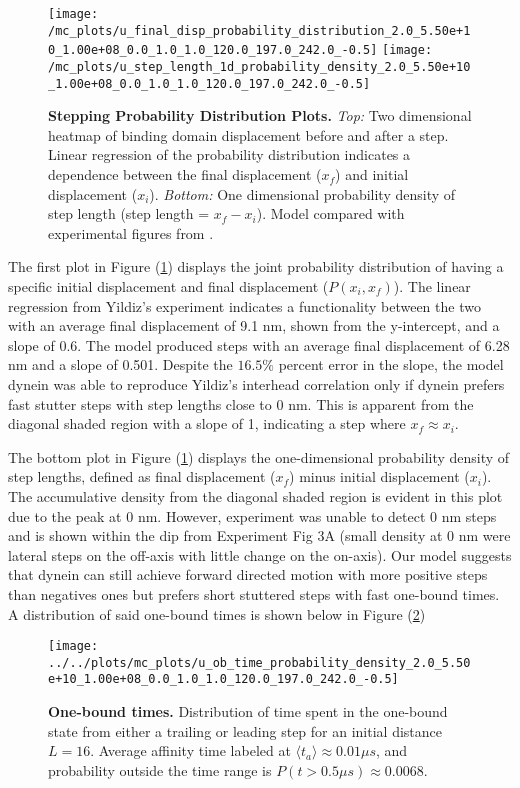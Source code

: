 \begin{figure}[H]
	\centering
	\texttt{[image: /mc\_plots/u\_final\_disp\_probability\_distribution\_2.0\_5.50e+10\_1.00e+08\_0.0\_1.0\_1.0\_120.0\_197.0\_242.0\_-0.5]}
	\texttt{[image: /mc\_plots/u\_step\_length\_1d\_probability\_density\_2.0\_5.50e+10\_1.00e+08\_0.0\_1.0\_1.0\_120.0\_197.0\_242.0\_-0.5]}
	\caption[Final Displacement Probability Distribution]{\textbf{Stepping Probability Distribution Plots.} \textit{Top:} Two dimensional heatmap of binding domain displacement before and after a step. Linear regression of the probability distribution indicates a dependence between the final displacement ($x_f$) and initial displacement ($x_i$). \textit{Bottom:} One dimensional probability density of step length (step length = $x_f-x_i$). Model compared with experimental figures from \citep{Dewitt2012}.} 
	\label{fig:DataFitYildiz}
\end{figure}
\newpage
The first plot in Figure (\ref{fig:DataFitYildiz}) displays the joint probability distribution of having a specific initial displacement and final displacement ($P(x_i,x_f)$). The linear regression from Yildiz's experiment indicates a functionality between the two with an average final displacement of 9.1 nm, shown from the y-intercept, and a slope of 0.6. The model produced steps with an average final displacement of 6.28 nm and a slope of 0.501. Despite the $16.5\%$ percent error in the slope, the model dynein was able to reproduce Yildiz's interhead correlation only if dynein prefers fast stutter steps with step lengths close to 0 nm. This is apparent from the diagonal shaded region with a slope of 1, indicating a step where $x_f\approx x_i$.


The bottom plot in Figure (\ref{fig:DataFitYildiz}) displays the one-dimensional probability density of step lengths, defined as final displacement ($x_f$) minus initial displacement ($x_i$). The accumulative density from the diagonal shaded region is evident in this plot due to the peak at 0 nm. However, experiment was unable to detect 0 nm steps and is shown within the dip from Experiment Fig 3A (small density at 0 nm were lateral steps on the off-axis with little change on the on-axis). Our model suggests that dynein can still achieve forward directed motion with more positive steps than negatives ones but prefers short stuttered steps with fast one-bound times. A distribution of said one-bound times is shown below in Figure (\ref{fig:OBtime}) 

\begin{figure}[H]
	\centering
	\texttt{[image: ../../plots/mc\_plots/u\_ob\_time\_probability\_density\_2.0\_5.50e+10\_1.00e+08\_0.0\_1.0\_1.0\_120.0\_197.0\_242.0\_-0.5]}
	\caption[One-bound times]{\textbf{One-bound times.} Distribution of time spent in the one-bound state from either a trailing or leading step for an initial distance $L=16$. Average affinity time labeled at $\langle t_a \rangle \approx 0.01 \mu s$, and probability outside the time range is $P(t>0.5\mu s) \approx 0.0068$.}
	\label{fig:OBtime}
\end{figure}

